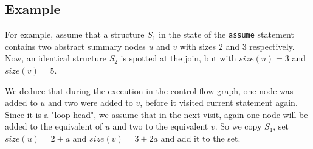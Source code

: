 \subsection*{Example}
For example, assume that a structure $S_1$ in the state of the \texttt{assume} statement contains two abstract summary nodes $u$ and $v$ with sizes $2$ and $3$ respectively. Now, an identical structure $S_2$ is spotted at the join, but with $size(u)=3$ and $size(v)=5$.

We deduce that during the execution in the control flow graph, one node was added to $u$ and two were added to $v$, before it visited current statement again. Since it is a "loop head", we assume that in the next visit, again one node will be added to the equivalent of $u$ and two to the equivalent $v$. So we copy $S_1$, set $size(u)=2+a$ and $size(v)=3+2a$ and add it to the set.